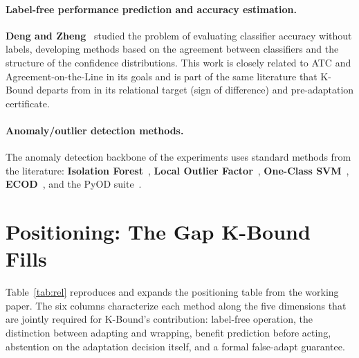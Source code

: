 \paragraph{Label-free performance prediction and accuracy estimation.}
\textbf{Deng and Zheng}~\cite{deng2021labels} studied the problem of evaluating
classifier accuracy without labels, developing methods based on the agreement
between classifiers and the structure of the confidence distributions.
This work is closely related to ATC \cite{garg2022atc} and Agreement-on-the-Line
\cite{baek2022agreement} in its goals and is part of the same literature that
K-Bound departs from in its relational target (sign of difference) and
pre-adaptation certificate.

\paragraph{Anomaly/outlier detection methods.}
The anomaly detection backbone of the experiments uses standard methods from
the literature: \textbf{Isolation Forest}~\cite{liu2008isolation},
\textbf{Local Outlier Factor}~\cite{breunig2000lof},
\textbf{One-Class SVM}~\cite{scholkopf2001estimating},
\textbf{ECOD}~\cite{li2022ecod}, and the PyOD suite~\cite{zhao2019pyod}.

\section{Positioning: The Gap K-Bound Fills}\label{sec:rel-gap}

Table~\ref{tab:rel} reproduces and expands the positioning table from the
working paper.
The six columns characterize each method along the five dimensions that are
jointly required for K-Bound's contribution: label-free operation, the
distinction between adapting and wrapping, benefit prediction before acting,
abstention on the adaptation decision itself, and a formal false-adapt
guarantee.


